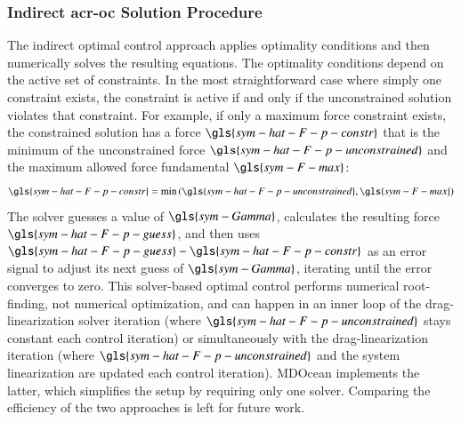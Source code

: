 \ifdefined\DISSERTATION
    \subsubsection{Indirect \gls{acr-oc} Solution Procedure}
    \label{sec:appendix-qp-numerical}
    The indirect optimal control approach applies optimality conditions and then numerically solves the resulting equations.
    The optimality conditions depend on the active set of constraints.
    In the most straightforward case where simply one constraint exists, the constraint is active if and only if the unconstrained solution violates that constraint.
    For example, if only a maximum force constraint exists, the constrained solution has a force $\gls{sym-hat-F-p-constr}$ that is the minimum of the unconstrained force $\gls{sym-hat-F-p-unconstrained}$ and the maximum allowed force fundamental $\gls{sym-F-max}$:
    \begin{equation}
    \gls{sym-hat-F-p-constr} = \min\left(\gls{sym-hat-F-p-unconstrained}, \gls{sym-F-max}\right)
    \end{equation}
    The solver guesses a value of $\gls{sym-Gamma}$, calculates the resulting force $\gls{sym-hat-F-p-guess}$, and then uses $\gls{sym-hat-F-p-guess}-\gls{sym-hat-F-p-constr}$ as an error signal to adjust its next guess of $\gls{sym-Gamma}$, iterating until the error converges to zero.
    This solver-based optimal control performs numerical root-finding, not numerical optimization, and can happen in an inner loop of the drag-linearization solver iteration (where $\gls{sym-hat-F-p-unconstrained}$ stays constant each control iteration) or simultaneously with the drag-linearization iteration (where $\gls{sym-hat-F-p-unconstrained}$ and the system linearization are updated each control iteration).
    MDOcean implements the latter, which simplifies the setup by requiring only one solver.
    Comparing the efficiency of the two approaches is left for future work.


